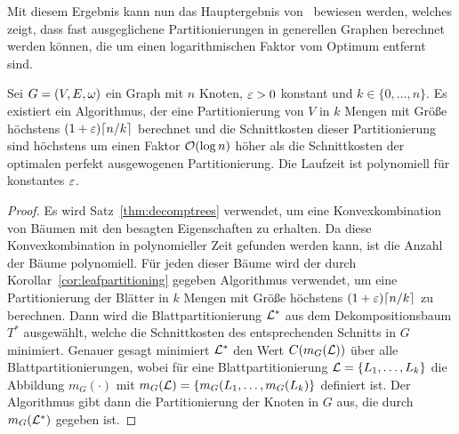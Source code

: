 Mit diesem Ergebnis kann nun das Hauptergebnis von~\parencite{ff13} bewiesen werden, welches zeigt, dass fast ausgeglichene Partitionierungen in generellen Graphen berechnet werden können, die um einen logarithmischen Faktor vom Optimum entfernt sind.

\begin{thm}
    Sei $G = (V, E, \omega)$ ein Graph mit $n$ Knoten, $\varepsilon > 0$ konstant und $k \in \{0, \ldots, n\}$. Es existiert ein Algorithmus, der eine Partitionierung von $V$ in $k$ Mengen mit Größe höchstens $(1 + \eps) \ceil*{n/k}$ berechnet und die Schnittkosten dieser Partitionierung sind höchstens um einen Faktor $\mathcal{O}(\log n)$ höher als die Schnittkosten der optimalen perfekt ausgewogenen Partitionierung.
    Die Laufzeit ist polynomiell für konstantes $\varepsilon$.
\end{thm}
\begin{proof}
    Es wird Satz~\ref{thm:decomptrees} verwendet, um eine Konvexkombination von Bäumen mit den besagten Eigenschaften zu erhalten.
    Da diese Konvexkombination in polynomieller Zeit gefunden werden kann, ist die Anzahl der Bäume polynomiell.
    Für jeden dieser Bäume wird der durch Korollar~\ref{cor:leafpartitioning} gegeben Algorithmus verwendet, um eine Partitionierung der Blätter in $k$ Mengen mit Größe höchstens $(1 + \eps) \ceil*{n/k}$ zu berechnen. Dann wird die Blattpartitionierung $\mathcal{L}^*$ aus dem Dekompositionsbaum $T^*$ ausgewählt, welche die Schnittkosten des entsprechenden Schnitts in $G$ minimiert.
    Genauer gesagt minimiert $\mathcal{L}^*$ den Wert $C(m_G(\mathcal{L}))$ über alle Blattpartitionierungen, wobei für eine Blattpartitionierung $\mathcal{L} = \{L_1, \ldots, L_k\}$ die Abbildung $m_G(\cdot)$ mit $m_G(\mathcal{L}) = \{m_G(L_1, \ldots, m_G(L_k)\}$ definiert ist.
    Der Algorithmus gibt dann die Partitionierung der Knoten in $G$ aus, die durch $m_G(\mathcal{L}^*)$ gegeben ist.


\end{proof}

